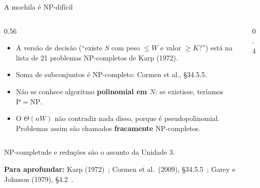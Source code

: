 \documentclass[aspectratio=169,xcolor=table]{beamer}
\newcommand{\fonte}[1]{%
  \vfill
  {\tiny\color{gray!55!black}\textbf{Para aprofundar:} #1\par}%
}
\begin{document}
\begin{frame}{A mochila é NP-difícil}
  \begin{columns}[c]
    \begin{column}{0.56\textwidth}
      \scriptsize
      \begin{itemize}\scriptsize
        \item A versão de decisão (``existe $S$ com peso $\le W$ e valor $\ge K$?'') está na
              lista de 21 problemas NP-completos de Karp (1972).
        \item Soma de subconjuntos é NP-completo: Cormen et al., \S 34.5.5.
        \item Não se conhece algoritmo \textbf{polinomial em $N$}; se existisse, teríamos
              $\mathrm{P}=\mathrm{NP}$.
        \item O $\Theta(nW)$ não contradiz nada disso, porque é pseudopolinomial.
              Problemas assim são chamados \textbf{fracamente} NP-completos.
      \end{itemize}
    \end{column}
    \begin{column}{0.4\textwidth}
      \centering
    \end{column}
  \end{columns}
  \medskip
  {\scriptsize NP-completude e reduções são o assunto da Unidade 3.\par}
  \fonte{Karp (1972)~\cite{karp1972reducibility}; Cormen et al.\ (2009),
    \S 34.5.5~\cite{cormen2009introduction}; Garey e Johnson (1979),
    \S 4.2~\cite{garey1979computers}.}
\end{frame}
\end{document}
